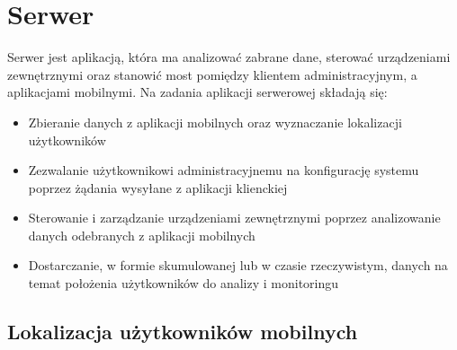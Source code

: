 \section{Serwer}
Serwer jest aplikacją, która ma analizować zabrane dane, sterować urządzeniami zewnętrznymi oraz stanowić most pomiędzy klientem administracyjnym, a aplikacjami mobilnymi. Na zadania aplikacji serwerowej składają się:
\begin{itemize}
	\item Zbieranie danych z aplikacji mobilnych oraz wyznaczanie lokalizacji użytkowników
	\item Zezwalanie użytkownikowi administracyjnemu na konfigurację systemu poprzez żądania wysyłane z aplikacji klienckiej
	\item Sterowanie i zarządzanie urządzeniami zewnętrznymi poprzez analizowanie danych odebranych z aplikacji mobilnych
	\item Dostarczanie, w formie skumulowanej lub w czasie rzeczywistym, danych na temat położenia użytkowników do analizy i monitoringu
\end{itemize}
\subsection{Lokalizacja użytkowników mobilnych}
